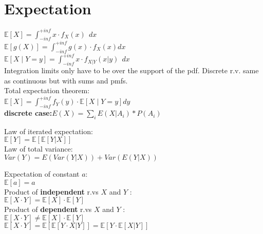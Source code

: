 \section{Expectation}

$\mathbb{E}\left[X\right]=\int_{-inf}^{+inf}{x \cdot f_X\left(x\right)\ \ dx}$\\

$\mathbb{E}\left[g\left(X\right)\right]=\int_{-inf}^{+inf}{g\left(x\right) \cdot f_X\left(x\right)dx}$\\

$\mathbb{E}\left[X\middle| Y=y\right]=\int_{-inf}^{+inf}{x \cdot { f}_{X|Y}\left(x|y\right)\ \ dx}$\\

Integration limits only have to be over the support of the pdf. Discrete r.v. same as continuous but with sums and pmfs.\\

Total expectation theorem:\\

$\mathbb{E}\left[X\right]=\int_{-inf}^{+inf}{f_Y\left(y\right)\cdot\mathbb{E}\left[X\middle| Y=y\right]dy}$\\

\textbf{discrete case:}$E(X)=\sum_{i}E(X|A_i)*P(A_i)$

Law of iterated expectation:\\

$\mathbb E[Y] = \mathbb E[\mathbb E[Y\rvert {X}]]$\\


Law of total variance:\\

$Var(Y)= E(Var(Y|X)) + Var(E(Y|X))$

Expectation of constant $a$:\\

$\mathbb{E}[a] = a$\\

Product of \textbf{independent} r.vs $X$ and $Y$ :\\

$\mathbb{E}[X \cdot Y] = \mathbb{E}[X] \cdot \mathbb{E}[Y]$\\

Product of \textbf{dependent} r.vs $X$ and $Y$ :\\

$\mathbb{E}[X \cdot Y] \neq \mathbb{E}[X] \cdot \mathbb{E}[Y]$\\

$\mathbb{E}[X \cdot Y] = \mathbb{E}[\mathbb{E}[Y \cdot X|Y]] = \mathbb{E}[Y \cdot \mathbb{E}[X|Y]]$\\

